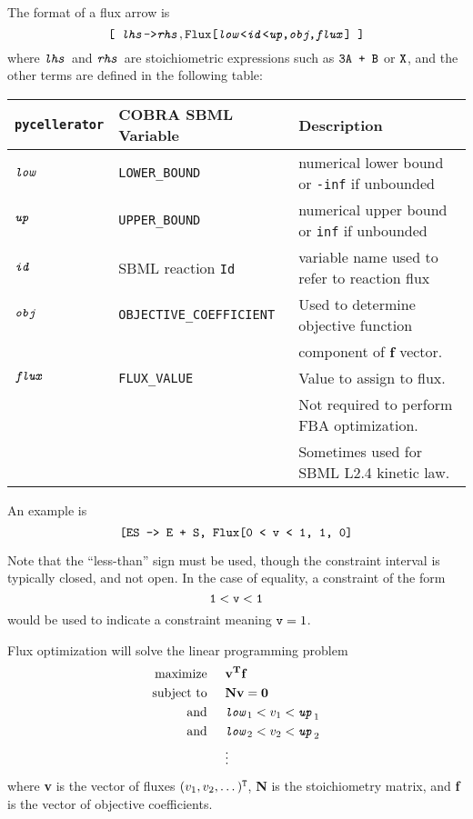 The format of a flux arrow is 
\begin{equation}
\text{\tt{[ \textit{lhs}}}\text{\tt{->}}\text{\tt{\textit{rhs}}},  \text{\tt{Flux[\textit{low}<\textit{id}<\textit{up},\textit{obj},\textit{flux}] ]}}
\end{equation}
where $\text{\tt{\textit{lhs}}}$ and $\text{\tt{\textit{rhs}}}$ are stoichiometric expressions such as $\text{\tt{3A + B}}$ or $\text{\tt{X}}$, and the other terms are defined in the following table:

\begin{center}
\begin{tabular}{|l|l|l|}
\hline
{\tt pycellerator} & COBRA SBML Variable & Description \\ \hline
$\text{\tt{\textit{low}}}$ & {\tt LOWER\_BOUND} &  numerical lower bound or {\tt -inf} if unbounded\\
$\text{\tt{\textit{up}}}$  & {\tt UPPER\_BOUND} &  numerical upper bound or {\tt inf} if unbounded\\
$\text{\tt{\textit{id}}}$  & SBML reaction {\tt Id} & variable name used to refer to reaction flux\\
$\text{\tt{\textit{obj}}}$ & {\tt OBJECTIVE\_COEFFICIENT} & Used to determine objective function\\
&& component of \textbf{f} vector. \\
$\text{\tt{\textit{flux}}}$ & {\tt FLUX\_VALUE} & Value to assign to flux. \\
&& Not required to perform FBA optimization. \\
&&Sometimes used for SBML L2.4 kinetic law.\\ \hline
\end{tabular}
\end{center}

An example is 
\begin{equation}
\text{\tt{[ES -> E + S, Flux[0 < v < 1, 1, 0]}}
\end{equation}

Note that the ``less-than'' sign must be used, though the constraint interval is typically closed, and not open. In the case of equality, a constraint of the form 
\begin{equation}
{\tt 1 < v < 1}
\end{equation}
would be used to indicate a constraint meaning ${\tt v}=1$.

Flux optimization will solve the linear programming problem 
\begin{align}
	\text{maximize}\hspace{5mm} & \mathbf{v^Tf}\\
	\text{subject to} \hspace{5mm} & \mathbf{Nv=0}\\
	\text{and}\hspace{5mm} & \text{\tt{\textit{low}}}_1 < v_1 < \text{\tt{\textit{up}}}_1\\
	\text{and}\hspace{5mm} & \text{\tt{\textit{low}}}_2 < v_2 < \text{\tt{\textit{up}}}_2\\
	&\vdots \nonumber
\end{align}
where \textbf{v} is the vector of fluxes $(v_1, v_2, \dots)^{\tt T}$, \textbf{N} is the stoichiometry matrix, and \textbf{f} is the vector of objective coefficients. 
 